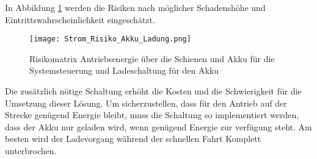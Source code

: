 \documentclass[../../main.tex]{subfiles}
\begin{document}
    In Abbildung \ref{fig:strom_risikomatrix_akku_mitladung} werden die Risiken nach möglicher Schadenshöhe und Eintrittswahrscheinlichkeit eingeschätzt.

    \begin{figure}[H]
        \centering
        \texttt{[image: Strom\_Risiko\_Akku\_Ladung.png]}
        \caption {Risikomatrix Antriebsenergie über die Schienen und Akku für die Systemsteuerung und Ladeschaltung für den Akku}
        \label{fig:strom_risikomatrix_akku_mitladung}
    \end{figure}

    Die zusätzlich nötige Schaltung erhöht die Kosten und die Schwierigkeit für die Umsetzung dieser Lösung. Um sicherzustellen, dass für den Antrieb auf der Strecke genügend Energie bleibt, muss die Schaltung so implementiert werden, dass der Akku nur geladen wird, wenn genügend Energie zur verfügung steht. Am besten wird der Ladevorgang während der schnellen Fahrt Komplett unterbrochen.

    
\end{document}
